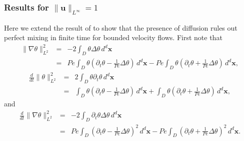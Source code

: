\documentclass[12pt]{iopart}
\newcommand{\ddt}[1]{\frac{d #1}{dt}}
\newcommand{\ltwo}[1]{\|#1\|_{L^{2}}}
\newcommand{\hone}[1]{\| \nabla #1\|_{L^{2}}}
\newcommand{\sint}[1]{\int_{D} #1 \, d^{d}\mathbf{x}}
\newcommand{\linf}[1]{\| #1 \|_{L^{\infty}}}
\renewcommand{\u}{\mathbf{u}}
\newcommand{\ppt}[1]{\partial_{t} #1}
\newcommand{\lap}{\Delta }
\begin{document}
\subsubsection{Results for $\linf{\u}= 1$}
Here we extend the result of \cite{Chi-Cheu1996} to show that the presence of diffusion rules out perfect mixing in finite time for bounded velocity flows.  First note that
%
\begin{eqnarray}
	 \hone{\theta}^2 &=& - 2\sint{\theta \lap \theta} \\
	 							&=& Pe \sint{\theta\left(\ppt{\theta}
	 									-\frac{1}{Pe}\lap \theta\right)} 
	 									-Pe \sint{\theta\left(\ppt{\theta}
	 									+\frac{1}{Pe}\lap \theta\right)},
\end{eqnarray}
%
\begin{eqnarray}
	\ddt{}\ltwo{\theta}^2 &=& 2\sint{\theta\ppt{\theta}} \\
										 &=&\sint{\theta\left(\ppt{\theta}
	 									-\frac{1}{Pe}\lap \theta\right)} 
										 + \sint{\theta\left(\ppt{\theta}
	 									+\frac{1}{Pe}\lap \theta\right)} ,
\end{eqnarray}
%
and
%
\begin{eqnarray}
	\ddt{}\hone{\theta}^2 &=& -2\sint{\ppt{\theta}\lap \theta} \\
	 									&=& Pe \sint{\left(\ppt{\theta}
	 									-\frac{1}{Pe}\lap \theta\right)^2} 
	 									-Pe \sint{\left(\ppt{\theta}
	 									+\frac{1}{Pe}\lap \theta\right)^2} .
\end{eqnarray}
\end{document}
